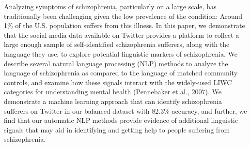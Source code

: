 Analyzing symptoms of schizophrenia, particularly on a large scale, has traditionally been challenging given the low prevalence of the condition: Around 1\% of the U.S. population suffers from this illness.  In this paper, we demonstrate that the social media data available on Twitter provides a platform to collect a large enough sample of self-identified schizophrenia sufferers, along with the language they use, to explore potential linguistic markers of schizophrenia. We describe several natural language processing (NLP) methods to analyze the language of schizophrenia as compared to the language of matched community controls, and examine how these signals interact with the widely-used LIWC categories for understanding mental health (Pennebaker et al., 2007).  We demonstrate a machine learning approach that can identify schizophrenia sufferers on Twitter in our balanced dataset with 82.3\% accuracy, and further, we find that our automatic NLP methods provide evidence of additional linguistic signals that may aid in identifying and getting help to people suffering from schizophrenia.
